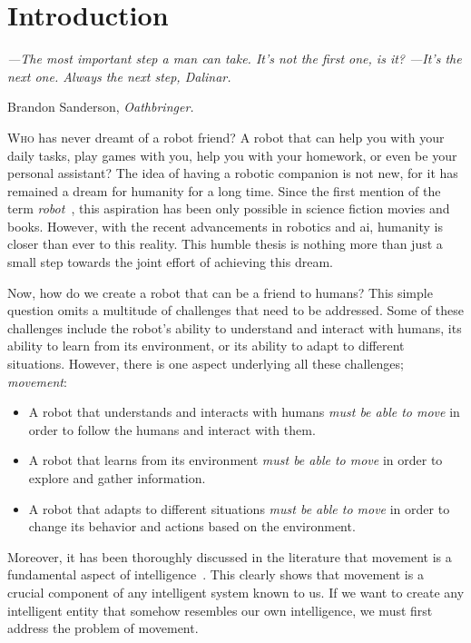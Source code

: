 \chapter{Introduction}\label{ch:introduction}

\setlength{}
\epigraph{\itshape ---The most important step a man can take.
It's not the first one, is it?
---It's the next one.
Always the next step, Dalinar.}{Brandon Sanderson, \textit{Oathbringer.}}

\lettrine{\textcolor{accent_color}{W}}{ho} has never dreamt of a robot friend?
A robot that can help you with your daily tasks, play games with you, help you with your homework, or even be your personal assistant?
The idea of having a robotic companion is not new, for it has remained a dream for humanity for a long time.
Since the first mention of the term \textit{robot}~\cite{robot1920}, this aspiration has been only possible in science fiction movies and books.
However, with the recent advancements in robotics and \acrfull{ai}, humanity is closer than ever to this reality.
This humble thesis is nothing more than just a small step towards the joint effort of achieving this dream.

Now, how do we create a robot that can be a friend to humans?
This simple question omits a multitude of challenges that need to be addressed.
Some of these challenges include the robot's ability to understand and interact with humans, its ability to learn from its environment, or its ability to adapt to different situations.
However, there is one aspect underlying all these challenges; \textit{movement}:

\begin{itemize}
    \item A robot that understands and interacts with humans \textit{must be able to move} in order to follow the humans and interact with them.
    \item A robot that learns from its environment \textit{must be able to move} in order to explore and gather information.
    \item A robot that adapts to different situations \textit{must be able to move} in order to change its behavior and actions based on the environment.
\end{itemize}

Moreover, it has been thoroughly discussed in the literature that movement is a fundamental aspect of intelligence~\cite{Darwin1871, Arbib2005, Leisman2016, Wolpert2011, Llinas2001}.
This clearly shows that movement is a crucial component of any intelligent system known to us.
If we want to create any intelligent entity that somehow resembles our own intelligence, we must first address the problem of movement.

